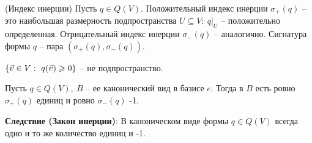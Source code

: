 \begin{multicols}{2}
\begin{definition}{(Индекс инерции)}{}
    Пусть $q\in Q(V)$. Положительный индекс инерции $\sigma_+(q)$ -- это наибольшая размерность подпространства $U\subseteq V: \ q\big|_U$ -- положительно определенная. Отрицательный индекс инерции $\sigma_-(q)$ -- аналогично. Сигнатура формы $q$ -- пара $\left(\sigma_+(q), \sigma_-(q)\right).$
\end{definition}
\begin{note}{}{}
    $\{\vec{v} \in V: \ q(\vec{v}) \geqslant 0\}$ -- не подпространство. 
\end{note}
\begin{theorema}{}{}
    Пусть $q\in Q(V), \ B$ -- ее канонический вид  в базисе $e$. Тогда в $B$ есть ровно $\sigma_+(q)$ единиц и ровно $\sigma_-(q)$ -1.
\end{theorema}
\textbf{Следствие (Закон инерции)}: В каноническом виде формы $q\in Q(V)$ всегда одно и то же количество единиц и -1.

\end{multicols}
